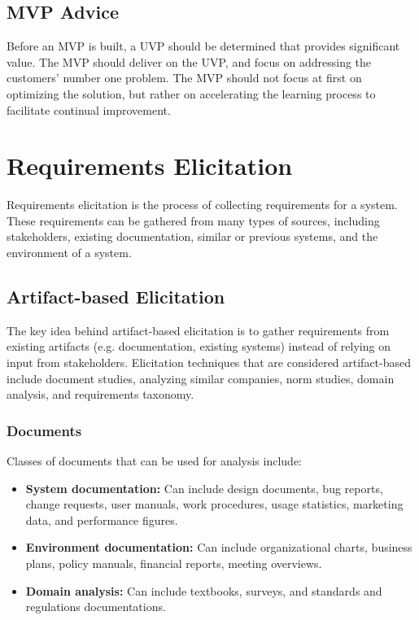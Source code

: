 \documentclass[12pt,titlepage]{article}
\let\stdsection\section
\renewcommand\section{\clearpage\stdsection}
\begin{document}
    \subsection{MVP Advice}
      Before an MVP is built, a UVP should be determined that provides significant value. The MVP should deliver on the UVP, and focus on
      addressing the customers' number one problem. The MVP should not focus at first on optimizing the solution, but rather on accelerating the
      learning process to facilitate continual improvement.

  \section{Requirements Elicitation}
    Requirements elicitation is the process of collecting requirements for a system. These requirements can be gathered from many types of sources,
    including stakeholders, existing documentation, similar or previous systems, and the environment of a system.

    \subsection{Artifact-based Elicitation}
      The key idea behind artifact-based elicitation is to gather requirements from existing artifacts (e.g. documentation, existing systems)
      instead of relying on input from stakeholders. Elicitation techniques that are considered artifact-based include
      document studies, analyzing similar companies, norm studies, domain analysis, and requirements taxonomy.

      \subsubsection{Documents}
        Classes of documents that can be used for analysis include:
        \begin{itemize}
          \item \textbf{System documentation:} Can include design documents, bug reports, change requests, user manuals, work procedures, usage statistics,
          marketing data, and performance figures.
          \item \textbf{Environment documentation:} Can include organizational charts, business plans, policy manuals, financial reports, meeting overviews.
          \item \textbf{Domain analysis:} Can include textbooks, surveys, and standards and regulations documentations.
        \end{itemize}
\end{document}
